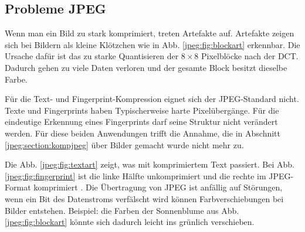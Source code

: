 \subsection{Probleme JPEG
\label{jpeg:subsection:probleme}}
Wenn man ein Bild zu stark komprimiert, treten Artefakte auf.
Artefakte zeigen sich bei Bildern als kleine Klötzchen wie in Abb. \ref{jpeg:fig:blockart} erkennbar.
Die Ursache dafür ist das zu starke Quantisieren der \(8\times8\) Pixelblöcke nach der DCT.
Dadurch gehen zu viele Daten verloren und der gesamte Block besitzt dieselbe Farbe.

Für die Text- und Fingerprint-Kompression eignet sich der JPEG-Standard nicht.
Texte und Fingerprints haben Typischerweise harte Pixelübergänge.
Für die eindeutige Erkennung eines Fingerprints darf seine Struktur nicht verändert werden.
Für diese beiden Anwendungen trifft die Annahme, die in Abschnitt \ref{jpeg:section:kompjpeg} über Bilder gemacht wurde nicht mehr zu.

Die Abb. \ref{jpeg:fig:textart} zeigt, was mit komprimiertem Text passiert.
Bei Abb. \ref{jpeg:fig:fingerprint} ist die linke Hälfte unkomprimiert und die rechte im JPEG-Format komprimiert .
Die Übertragung von JPEG ist anfällig auf Störungen, wenn ein Bit des Datenstroms verfälscht wird können Farbverschiebungen bei Bilder entstehen.
Beispiel: die Farben der Sonnenblume aus Abb. \ref{jpeg:fig:blockart} könnte sich dadurch leicht ins grünlich verschieben.


